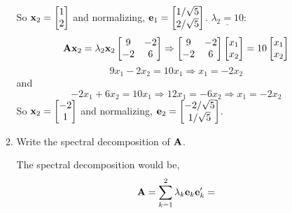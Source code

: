 \begin{enumerate}[font=\bfseries]
\begin{enumerate}
\[            \]
            So $\bold{x}_2 = \begin{bmatrix}
                1 \\
                2
            \end{bmatrix}$ and normalizing, $\bold{e}_1 = \begin{bmatrix}
                1/\sqrt{5} \\
                2/\sqrt{5}
            \end{bmatrix}$.
            \newline
            $\underline{\lambda_2 = 10}$:
            \[
                \bold{A}\bold{x}_2 = \lambda_2 \bold{x}_2
                \begin{bmatrix}
                    9 & -2 \\
                    -2 & 6
                \end{bmatrix} \Rightarrow
                \begin{bmatrix}
                    9 & -2 \\
                    -2 & 6
                \end{bmatrix}
                \begin{bmatrix}
                    x_1 \\
                    x_2
                \end{bmatrix} = 
                10\begin{bmatrix}
                    x_1 \\
                    x_2
                \end{bmatrix}
            \]
            \[
                9x_1 - 2x_2 = 10x_1 \Rightarrow x_1 = -2x_2
            \]
            and
            \[
                -2x_1 + 6x_2 = 10x_1 \Rightarrow 12x_1 = -6x_2 \Rightarrow x_1 = -2x_2
            \]
            So $\bold{x}_2 = \begin{bmatrix}
                -2 \\
                1
            \end{bmatrix}$ and normalizing, $\bold{e}_2 = \begin{bmatrix}
                -2/\sqrt{5} \\
                1/\sqrt{5}
            \end{bmatrix}$.
            \item Write the spectral decomposition of $\bold{A}$.
            \par
            The spectral decomposition would be,
            \[
                \bold{A} = \sum_{k=1}^2{\lambda_k\bold{e}_k\bold{e}_k^\prime} = 
\]
\end{enumerate}
\end{enumerate}
